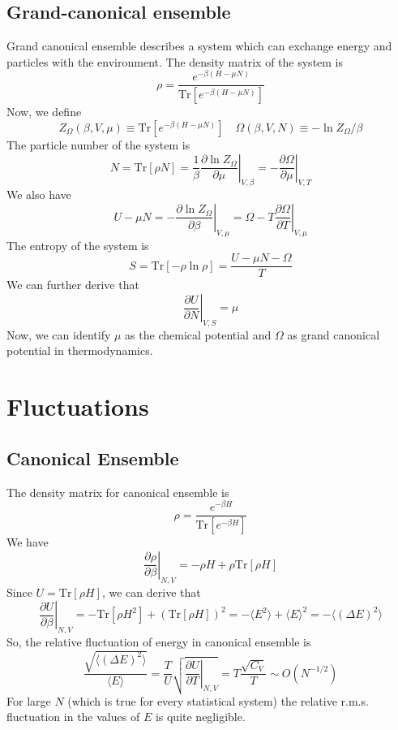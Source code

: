 \documentclass[cyan]{elegantnote}
\begin{document}
\subsection{Grand-canonical ensemble}
Grand canonical ensemble describes a system which can exchange energy and particles with the environment. The density matrix of the system is
\[\rho = \frac{e^{-\beta (H - \mu N)}}{\mathrm{Tr}[e^{-\beta (H - \mu N)}]}\]
Now, we define
\[Z_{\Omega}(\beta,V,\mu) \equiv \mathrm{Tr}[e^{-\beta (H-\mu N)}] \quad \Omega(\beta,V,N) \equiv -\ln Z_{\Omega}/\beta\]
The particle number of the system is
\[N = \mathrm{Tr}[\rho N] = \frac{1}{\beta}\left. \frac{\partial \ln Z_{\Omega}}{\partial \mu} \right|_{V,\beta} = -\left. \frac{\partial \Omega}{\partial \mu} \right|_{V,T}\]
We also have
\[U - \mu N = -\left. \frac{\partial \ln Z_{\Omega}}{\partial \beta} \right|_{V,\mu} = \Omega - T\left. \frac{\partial \Omega}{\partial T} \right|_{V,\mu} \]
The entropy of the system is
\[S = \mathrm{Tr}[-\rho\ln\rho] = \frac{U-\mu N - \Omega}{T}\]
We can further derive that
\[\left. \frac{\partial U}{\partial N}\right|_{V,S} = \mu\]
Now, we can identify $\mu$ as the chemical potential and $\Omega$ as grand canonical potential in thermodynamics.

\section{Fluctuations}
\subsection{Canonical Ensemble}
The density matrix for canonical ensemble is
\[\rho = \frac{e^{-\beta H}}{\mathrm{Tr}[e^{-\beta H}]}\]
We have
\[\left. \frac{\partial \rho}{\partial \beta} \right|_{N,V} = -\rho H + \rho \mathrm{Tr}[\rho H]\]
Since $U = \mathrm{Tr}[\rho H]$, we can derive that
\[\left. \frac{\partial U}{\partial \beta} \right|_{N,V} = -\mathrm{Tr}[\rho H^2] + (\mathrm{Tr}[\rho H])^2 = -\langle E^2 \rangle + \langle E \rangle^2 = -\langle (\Delta E)^2 \rangle\]
So, the relative fluctuation of energy in canonical ensemble is
\[\frac{\sqrt{\langle (\Delta E)^2 \rangle}}{\langle E \rangle} = \frac{T}{U}\sqrt{\left. \frac{\partial U}{\partial T} \right|_{N,V}} = T \frac{\sqrt{C_V}}{T} \sim O(N^{-1/2})\]
For large $N$ (which is true for every statistical system) the relative r.m.s. fluctuation in the values of $E$ is quite negligible.
\end{document}

